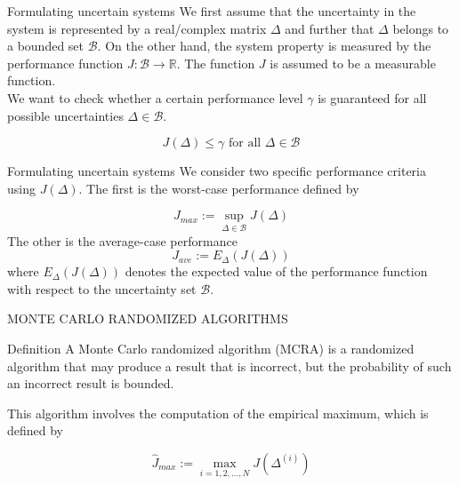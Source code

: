 \documentclass[xcolor={dvipsnames}]{beamer}
\begin{document}
	\begin{frame}{Formulating uncertain systems}
		We first assume that the uncertainty in the system is
		represented by a real/complex matrix $\Delta$ and further that
		$\Delta$ belongs to a bounded set $\mathscr{B}$. On the other hand, the
		system property is measured by the performance function
		$J : \mathscr{B} \rightarrow \mathbb{R}$. The function $J$ is assumed to be a measurable
		function.\\
        We want to check
        whether a certain performance level $\gamma$ is guaranteed for
        all possible uncertainties $\Delta \in \mathscr{B}$.
        \begin{alertblock}{}
            \begin{equation}
                \label{eqn:1}
                J(\Delta ) \leqslant \gamma \textrm{ for all } \Delta \in \mathscr{B}
            \end{equation}
        \end{alertblock}
        
    \end{frame}

	\begin{frame}{Formulating uncertain systems}
        We consider two specific performance criteria using
        $J(\Delta )$. The first is the worst-case performance defined by
        \begin{alertblock}{}
            \begin{equation} 	
                J_{max}:= \sup_{\Delta \in \mathscr{B} }J(\Delta ) 
            \end{equation}
            The other is the average-case performance 
            \begin{equation*} 	
                J_{ave}:= E_{\Delta}(J(\Delta )) 
            \end{equation*}
            where $E_{\Delta}(J(\Delta ))$ denotes the expected 
            value of the performance function with respect to the uncertainty set $\mathscr{B}$.
        \end{alertblock}
        
        
    \end{frame}

	\begin{frame}{MONTE CARLO RANDOMIZED ALGORITHMS}
        \begin{block}{Definition}
            A Monte Carlo randomized algorithm
            (MCRA) is a randomized algorithm that may produce a
            result that is incorrect, but the
            probability of such an incorrect result is bounded.
        \end{block}
        
        This algorithm involves the computation of the
        empirical maximum, which is defined by  
        \begin{alertblock}{}
            \begin{equation*} 	
                \hat{J}_{max}:= \max_{i=1, 2, ..., N}J(\Delta ^{(i)}) 
            \end{equation*}
        \end{alertblock}
        
    \end{frame}
\end{document}
